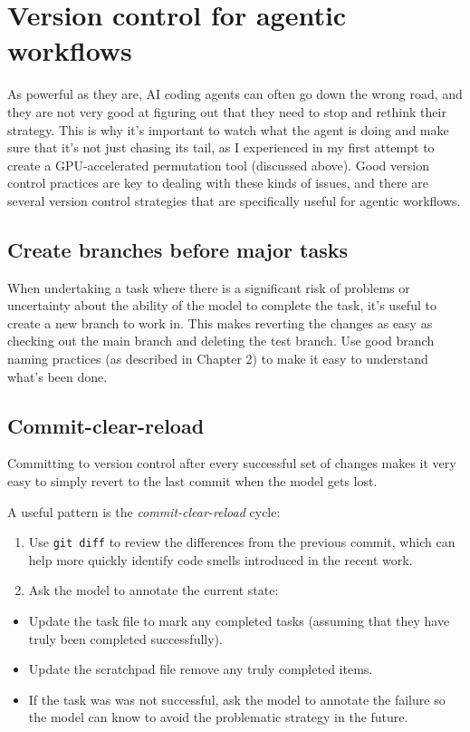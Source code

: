 \section{Version control for agentic workflows}

As powerful as they are, AI coding agents can often go down the wrong road, and they are not very good at figuring out that they need to stop and rethink their strategy.
This is why it's important to watch what the agent is doing and make sure that it's not just chasing its tail, as I experienced in my first attempt to create a GPU-accelerated permutation tool (discussed above).
Good version control practices are key to dealing with these kinds of issues, and there are several version control strategies that are specifically useful for agentic workflows.

\subsection{Create branches before major tasks}

When undertaking a task where there is a significant risk of problems or uncertainty about the ability of the model to complete the task, it's useful to create a new branch to work in. This makes reverting the changes as easy as checking out the main branch and deleting the test branch.  Use good branch naming practices (as described in Chapter 2) to make it easy to understand what's been done.

\subsection{Commit-clear-reload}

Committing to version control after every successful set of changes makes it very easy to simply revert to the last commit when the model gets lost.

A useful pattern is the \textit{commit-clear-reload} cycle:

\begin{enumerate}
\item Use \texttt{git diff} to review the differences from the previous commit, which can help more quickly identify code smells introduced in the recent work.
\item Ask the model to annotate the current state:
\end{enumerate}

\begin{itemize}
\item Update the task file to mark any completed tasks (assuming that they have truly been completed successfully).
\item Update the scratchpad file remove any truly completed items.
\item If the task was was not successful, ask the model to annotate the failure so the model can know to avoid the problematic strategy in the future.
\end{itemize}

